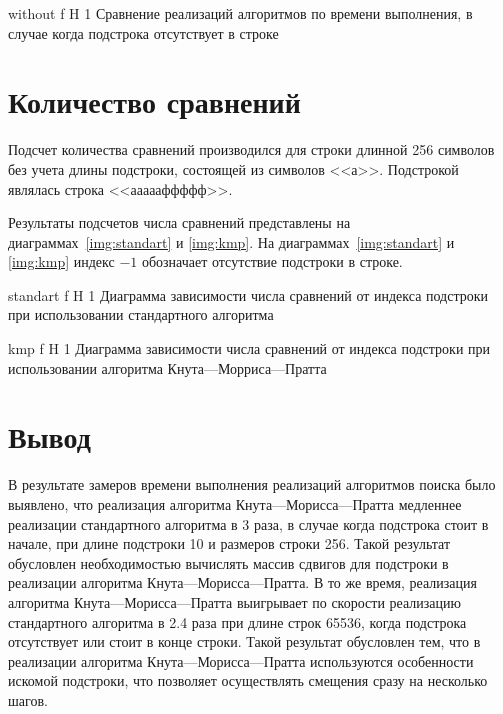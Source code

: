 {without} %
{f} %
{H} %
{1\textwidth} %
{Сравнение реализаций алгоритмов по времени выполнения, в случае когда подстрока отсутствует в строке} %

\clearpage


\section{Количество сравнений}

Подсчет количества сравнений производился для строки длинной 256 символов без учета длины подстроки, состоящей из символов <<а>>. Подстрокой являлась строка <<аааааффффф>>. 

Результаты подсчетов числа сравнений представлены на диаграммах~\ref{img:standart} и \ref{img:kmp}. На диаграммах~\ref{img:standart} и \ref{img:kmp} индекс $-1$ обозначает отсутствие подстроки в строке. 

{standart} %
{f} %
{H} %
{1\textwidth} %
{Диаграмма зависимости числа сравнений от индекса подстроки при использовании стандартного алгоритма} %


{kmp} %
{f} %
{H} %
{1\textwidth} %
{Диаграмма зависимости числа сравнений от индекса подстроки при использовании алгоритма Кнута---Морриса---Пратта} %

\clearpage

\section*{Вывод}

В результате замеров времени выполнения реализаций алгоритмов поиска было выявлено, что реализация алгоритма Кнута---Морисса---Пратта медленнее реализации стандартного алгоритма в 3 раза, в случае когда подстрока стоит в начале, при длине подстроки 10 и размеров строки 256. 
Такой результат обусловлен необходимостью вычислять массив сдвигов для подстроки в реализации алгоритма Кнута---Морисса---Пратта.
В то же время, реализация алгоритма Кнута---Морисса---Пратта выигрывает по скорости реализацию стандартного алгоритма в 2.4 раза при длине строк 65536, когда подстрока отсутствует или стоит в конце строки. 
Такой результат обусловлен тем, что в реализации алгоритма Кнута---Морисса---Пратта используются особенности искомой подстроки, что позволяет осуществлять смещения сразу на несколько шагов.

